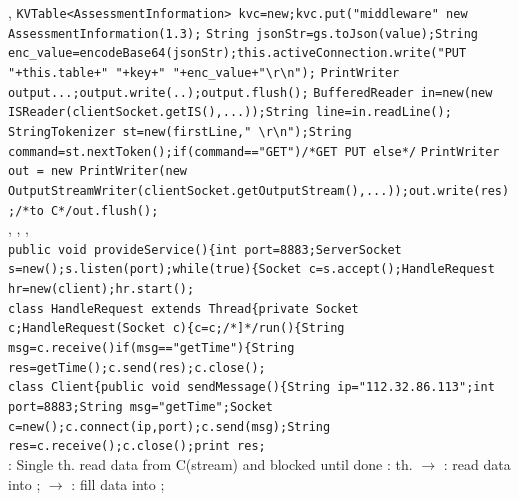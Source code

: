 , 
\textbar
{}
\lstinline{KVTable<AssessmentInformation> kvc=new;kvc.put("middleware" new AssessmentInformation(1.3);}
\lstinline{String jsonStr=gs.toJson(value);String enc_value=encodeBase64(jsonStr);this.activeConnection.write("PUT "+this.table+" "+key+" "+enc_value+"\r\n");}
\lstinline{PrintWriter output...;output.write(..);output.flush();}
\lstinline{BufferedReader in=new(new ISReader(clientSocket.getIS(),...));String line=in.readLine();}
\lstinline{StringTokenizer st=new(firstLine," \r\n");String command=st.nextToken();if(command=="GET")/*GET PUT else*/}
\lstinline{PrintWriter out = new PrintWriter(new OutputStreamWriter(clientSocket.getOutputStream(),...));out.write(res);/*to C*/out.flush();}
\\
\textbar
{} , 
, 
 ,
 
\\
\lstinline{public void provideService(){int port=8883;ServerSocket s=new();s.listen(port);while(true){Socket c=s.accept();HandleRequest hr=new(client);hr.start();}  
\\
\lstinline{class HandleRequest extends Thread{private Socket c;HandleRequest(Socket c){c=c;/*]*/run(){String msg=c.receive()if(msg=="getTime"){String res=getTime();c.send(res);c.close();}
\\
\lstinline{class Client{public void sendMessage(){String ip="112.32.86.113";int port=8883;String msg="getTime";Socket c=new();c.connect(ip,port);c.send(msg);String res=c.receive();c.close();print res;}
\\
: 
Single th. read data from C(stream) and blocked until done
: 
th. $\rightarrow$ : 
read data into ; 
 $\rightarrow$ : 
fill data into ; 
